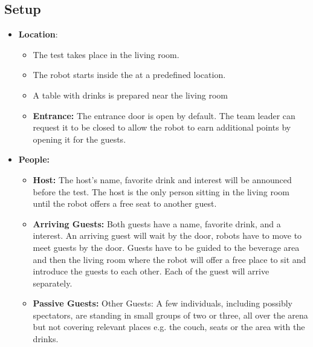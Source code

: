 \subsection*{Setup}
\begin{itemize}
	\item \textbf{Location}: 
	\begin{itemize}
	\item The test takes place in the living room.	
	\item The robot starts inside the \Arena{} at a predefined location.
	\item A table with drinks is prepared near the living room
	\item \textbf{Entrance:} The entrance door is open by default. The team leader can request it to be closed to allow the robot to earn additional points by opening it for the guests.
	\end{itemize}
	
	\item \textbf{People:} 
	\begin{itemize}
	\item \textbf{Host:} The host's name, favorite drink and interest will be announced before the test. The host is the only person sitting in the living room until the robot offers a free seat to another guest.
	\item \textbf{Arriving Guests:} Both guests have a name, favorite drink, and a interest. An arriving guest will wait by the door, robots have to move to meet guests by the door. Guests have to be guided to the beverage area and then the living room where the robot will offer a free place to sit and introduce the guests to each other. Each of the guest will arrive separately. 
	\item \textbf{Passive Guests:} Other Guests: A few individuals, including possibly spectators, are standing in small groups of two or three, all over the arena but not covering relevant places e.g. the couch, seats or the area with the drinks.
	\end{itemize}

\end{itemize}

